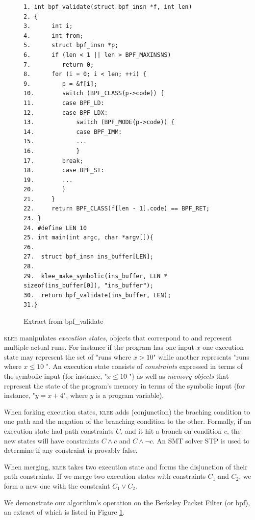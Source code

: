 \documentclass[12pt,a4paper]{article}
\newcommand{\klee}{\textsc{klee }}
\begin{document}
\linespread{0}
\begin{figure}
\small
\begin{verbatim}
1. int bpf_validate(struct bpf_insn *f, int len)
2. {
3.      int i;
4.      int from;
5.      struct bpf_insn *p;
6.      if (len < 1 || len > BPF_MAXINSNS)
7.         return 0;
8.      for (i = 0; i < len; ++i) {
9.         p = &f[i];
10.        switch (BPF_CLASS(p->code)) {
11.        case BPF_LD:
12.        case BPF_LDX:
13.            switch (BPF_MODE(p->code)) {
14.            case BPF_IMM:
15.            ...
16.            }
17.        break;
18.        case BPF_ST:
19.        ...
20.        }
21.     }
22.     return BPF_CLASS(f[len - 1].code) == BPF_RET;
23. }
24. #define LEN 10 
25. int main(int argc, char *argv[]){  
26.
27.  struct bpf_insn ins_buffer[LEN];
28.
29.  klee_make_symbolic(ins_buffer, LEN * sizeof(ins_buffer[0]), "ins_buffer");
30.  return bpf_validate(ins_buffer, LEN);
31.}
\end{verbatim}
\caption{Extract from bpf\_validate}
\label{bpfcode}
\end{figure}

\klee manipulates \emph{execution states}, objects that correspond to and represent multiple actual runs. For instance if the program has one input $x$ one execution state may represent the set of "runs where $x > 10$" while another represents "runs where $x \le 10$ ". An execution state consists of \emph{constraints} expressed in terms of the symbolic input (for instance, "$x \le 10$ ") as well as \emph{memory objects} that represent the state of the program's memory in terms of the symbolic input (for instance, "$y = x + 4$", where $y$ is a program variable).

When forking execution states, \klee adds (conjunction) the braching condition to one path and the negation of the branching condition to the other. Formally, if an execution state had path constraints $C$, and it hit a branch on condition $c$, the new states will have constraints $C \wedge c$ and $C \wedge \neg c$. An SMT solver STP \cite{bitvecarray} is used to determine if any constraint is provably false.

When merging, \klee takes two execution state and forms the disjunction of their path constraints. If we merge two execution states with constraints $C_1$ and $C_2$, we form a new one with the constraint $C_1 \vee C_2$.

We demonstrate our algorithm's operation on the Berkeley Packet Filter (or bpf), an extract of which is listed in Figure \ref{bpfcode}.
\end{document}
